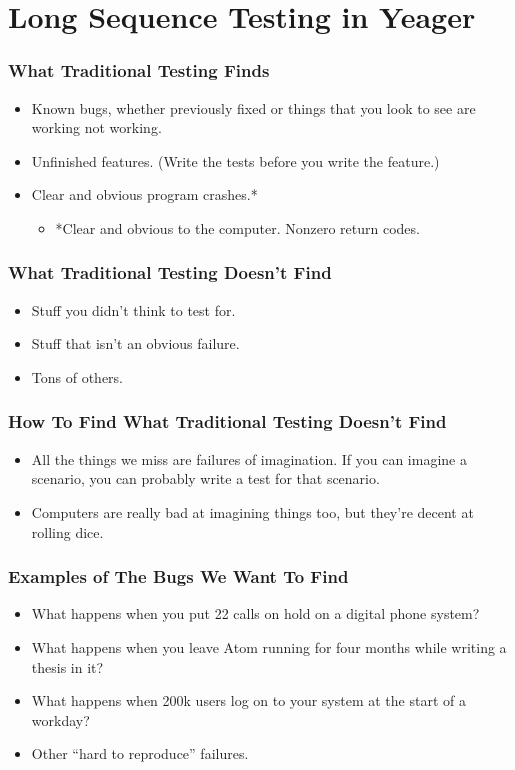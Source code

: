 \section{Long Sequence Testing in Yeager}

\begin{frame}
  \frametitle{What Traditional Testing Finds}
  \begin{itemize}
    \item Known bugs, whether previously fixed or things that you look to see are working not working.
    \item Unfinished features. (Write the tests before you write the feature.)
    \item Clear and obvious program crashes.*
    \begin{itemize}
      \item *Clear and obvious to the computer. Nonzero return codes.
    \end{itemize}
  \end{itemize}
\end{frame}

\begin{frame}
  \frametitle{What Traditional Testing Doesn't Find}
  \begin{itemize}
    \item Stuff you didn't think to test for.
    \item Stuff that isn't an obvious failure.
    \item Tons of others.
  \end{itemize}
\end{frame}

\begin{frame}
  \frametitle{How To Find What Traditional Testing Doesn't Find}
  \begin{itemize}
    \item All the things we miss are failures of imagination. If you can imagine a scenario, you can probably write a test for that scenario.
    \item Computers are really bad at imagining things too, but they're decent at rolling dice.
  \end{itemize}
\end{frame}

\begin{frame}
  \frametitle{Examples of The Bugs We Want To Find}
  \begin{itemize}
    \item What happens when you put 22 calls on hold on a digital phone system?
    \item What happens when you leave Atom running for four months while writing a thesis in it?
    \item What happens when 200k users log on to your system at the start of a workday?
    \item Other ``hard to reproduce'' failures.
  \end{itemize}
\end{frame}

